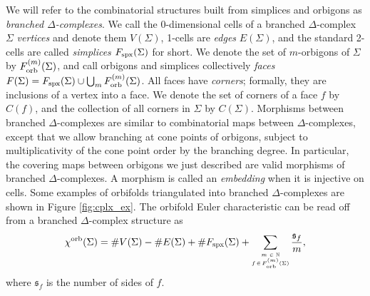 \documentclass{amsart}
\newcommand{\cho}{\chi^{\textnormal{orb}}}
\newcommand{\Fspx}{F_{\textnormal{spx}}}
\newcommand{\Forb}[1][m]{F^{(#1)}_{\textnormal{orb}}}
\newcommand{\iterorb}{{\tiny\begin{matrix}m\in\mathbb{N}\\f\!\in\!\Forb(\Sigma)\end{matrix}}}
\begin{document}
We will refer to the combinatorial structures built from simplices and orbigons as \emph{branched $\Delta$-complexes}. We call the 0-dimensional cells of a branched $\Delta$-complex $\Sigma$ \emph{vertices} and denote them $V(\Sigma)$, 1-cells are \emph{edges} $E(\Sigma)$, and the standard 2-cells are called \emph{simplices} $\Fspx(\Sigma)$ for short. We denote the set of $m$-orbigons of $\Sigma$ by $\Forb(\Sigma)$, and call orbigons and simplices collectively \emph{faces} $F(\Sigma)=\Fspx(\Sigma)\cup\bigcup_m\Forb(\Sigma)$. All faces have \emph{corners}; formally, they are inclusions of a vertex into a face. We denote the set of corners of a face $f$ by $C(f)$, and the collection of all corners in $\Sigma$ by $C(\Sigma)$. Morphisms between branched $\Delta$-complexes are similar to combinatorial maps between $\Delta$-complexes, except that we allow branching at cone points of orbigons, subject to multiplicativity of the cone point order by the branching degree. In particular, the covering maps between orbigons we just described are valid morphisms of branched $\Delta$-complexes. A morphism is called an \emph{embedding} when it is injective on cells. Some examples of orbifolds triangulated into branched $\Delta$-complexes are shown in Figure \ref{fig:cplx_ex}. The orbifold Euler characteristic can be read off from a branched $\Delta$-complex structure as
\begin{equation}\label{eq:cho_combi}
\cho(\Sigma)=\#V(\Sigma)-\#E(\Sigma)+\#\Fspx(\Sigma)+\sum_\iterorb\frac{\mathfrak{s}_f}{m},
\end{equation}
where $\mathfrak{s}_f$ is the number of sides of $f$.
\end{document}
